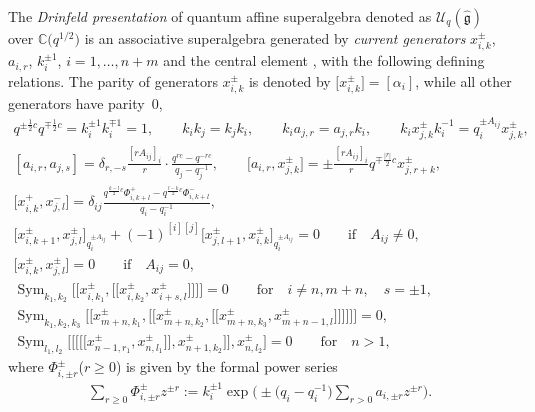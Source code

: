 \documentclass[pdftex]{sigma}
\numberwithin{equation}{section}
\begin{document}
\begin{Definition}
The \emph{Drinfeld presentation} of quantum affine superalgebra denoted as $\mathcal{U}_q(\mathfrak{\hat{g}})$ over $\mathbb{C}\bigl(q^{1/2}\bigr)$ is an associative superalgebra generated by \emph{current generators} $x_{i,k}^{\pm}$, $a_{i,r}$, $k_i^{\pm 1}$, $i=1,\dots,n+m$ and the central element , with the following defining relations. The parity of generators $x_{i,k}^{\pm}$ is denoted by $\bigl[x_{i,k}^{\pm}\bigr]=[\alpha_i]$, while all other generators have parity~0,
\begin{gather*}%
 q^{\pm\frac{1}{2}c}q^{\mp\frac{1}{2}c}=k_i^{\pm 1}k_i^{\mp 1}=1, \qquad k_ik_j=k_jk_i, \qquad
 k_ia_{j,r}=a_{j,r}k_i, \qquad k_ix_{j,k}^{\pm}k_i^{-1}=q_i^{\pm A_{ij}}x_{j,k}^{\pm}, \\
 [a_{i,r}, a_{j,s}]=\delta_{r,-s}\frac{[r A_{ij}]_{i}}{r}\cdot\frac{q^{r c}-q^{-r c}}{q_j-q_j^{-1}}, \qquad
 \bigl[a_{i,r}, x_{j,k}^{\pm}\bigr]=\pm\frac{[r A_{ij}]_{i}}{r}q^{\mp\frac{|r|}{2}c}x_{j,r+k}^{\pm}, \\
 \bigl[x_{i,k}^+, x_{j,l}^-\bigr]=\delta_{ij}\frac{q^{\frac{k-l}{2}c}\Phi_{i,k+l}^+-q^{\frac{l-k}{2}c}\Phi_{i,k+l}^-}{q_i-q_i^{-1}}, \\
 \bigl[x_{i,k+1}^{\pm}, x_{j,l}^{\pm}\bigr]_{q_i^{\pm A_{ij}}}+(-1)^{[i][j]}\bigl[x_{j,l+1}^{\pm}, x_{i,k}^{\pm}\bigr]_{q_i^{\pm A_{ij}}}=0 \qquad\textrm{if}\quad A_{ij}\neq0, \\
 \bigl[x_{i,k}^{\pm}, x_{j,l}^{\pm}\bigr]=0\qquad \textrm{if}\quad A_{ij}=0, \\
 \operatorname{Sym}_{k_1,k_2}\bigl[\!\!\bigl[x_{i,k_1}^{\pm},\bigl[\!\!\bigl[x_{i,k_2}^{\pm}, x_{i+s,l}^{\pm}\bigr]\!\!\bigr] \bigr]\!\!\bigr]=0\qquad\textrm{for}\quad i\neq n,m+n,\quad s=\pm 1, \\
 \operatorname{Sym}_{k_1,k_2,k_3}\bigl[\!\!\bigl[x_{m+n,k_1}^{\pm}, \bigl[\!\!\bigl[x_{m+n,k_2}^{\pm},\bigl[\!\!\bigl[x_{m+n,k_3}^{\pm}, x_{m+n-1,l}^{\pm}\bigr]\!\!\bigr] \bigr]\!\!\bigr] \bigr]\!\!\bigr]=0, \\
 \operatorname{Sym}_{l_1,l_2}\bigl[ \bigl[\!\!\bigl[ \bigl[\!\!\bigl[x_{n-1,r_1}^{\pm}, x_{n,l_1}^{\pm}\bigr]\!\!\bigr], x_{n+1,k_2}^{\pm}\bigr]\!\!\bigr], x_{n,l_2}^{\pm}\bigr]=0
\qquad\textrm{for}\quad n>1,
\end{gather*}
where $\Phi_{i,\pm r}^{\pm}$($r\geqslant 0$) is given by the formal power series
\begin{gather*}%
 \sum\limits_{r\geqslant 0}\Phi_{i,\pm r}^{\pm}z^{\pm r}:=k_i^{\pm 1}\exp\biggl(\pm \bigl(q_i-q_i^{-1}\bigr)\sum\limits_{r>0}a_{i,\pm r}z^{\pm r}\biggr).
\end{gather*}
\end{Definition}
\end{document}
